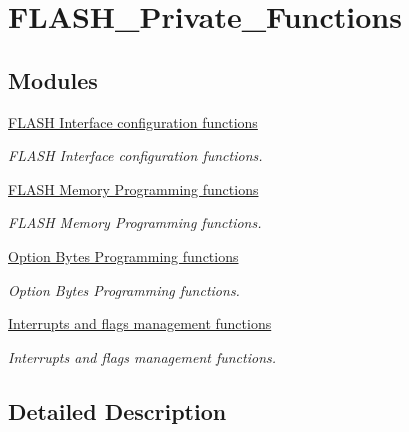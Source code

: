 \hypertarget{group___f_l_a_s_h___private___functions}{\section{F\-L\-A\-S\-H\-\_\-\-Private\-\_\-\-Functions}
\label{group___f_l_a_s_h___private___functions}
}
\subsection*{Modules}
\begin{DoxyCompactItemize}
\item 
\hyperlink{group___f_l_a_s_h___group1}{F\-L\-A\-S\-H Interface configuration functions}
\begin{DoxyCompactList}\small\item\em F\-L\-A\-S\-H Interface configuration functions. \end{DoxyCompactList}\item 
\hyperlink{group___f_l_a_s_h___group2}{F\-L\-A\-S\-H Memory Programming functions}
\begin{DoxyCompactList}\small\item\em F\-L\-A\-S\-H Memory Programming functions. \end{DoxyCompactList}\item 
\hyperlink{group___f_l_a_s_h___group3}{Option Bytes Programming functions}
\begin{DoxyCompactList}\small\item\em Option Bytes Programming functions. \end{DoxyCompactList}\item 
\hyperlink{group___f_l_a_s_h___group4}{Interrupts and flags management functions}
\begin{DoxyCompactList}\small\item\em Interrupts and flags management functions. \end{DoxyCompactList}\end{DoxyCompactItemize}


\subsection{Detailed Description}

